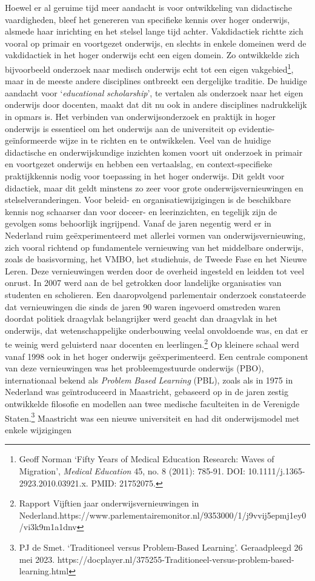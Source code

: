 \documentclass[smallauthor, chapterhaspagenum, nochapterinheader, pagenuminheader,  bigchapnum,medium2, tocpages,  garamond, titleinheader]{jote-book}
\begin{document}
	Hoewel er al geruime tijd meer aandacht is voor ontwikkeling van didactische vaardigheden, bleef het genereren van specifieke kennis over hoger onderwijs, alsmede haar inrichting en het stelsel lange tijd achter. Vakdidactiek richtte zich vooral op primair en voortgezet onderwijs, en slechts in enkele domeinen werd de vakdidactiek in het hoger onderwijs echt een eigen domein. Zo ontwikkelde zich bijvoorbeeld onderzoek naar medisch onderwijs echt tot een eigen vakgebied\footnote{Geoff Norman ‘Fifty Years of Medical Education Research: Waves of Migration', \emph{Medical}\emph{ }\emph{Education}\emph{ }45, no. 8 (2011): 785-91. DOI: 10.1111/j.1365-2923.2010.03921.x. PMID: 21752075.}, maar in de meeste andere disciplines ontbreekt een dergelijke traditie. De huidige aandacht voor ‘\emph{educational}\emph{ }\emph{scholarship}', te vertalen als onderzoek naar het eigen onderwijs door docenten, maakt dat dit nu ook in andere disciplines nadrukkelijk in opmars is. Het verbinden van onderwijsonderzoek en praktijk in hoger onderwijs is essentieel om het onderwijs aan de universiteit op evidentie-geïnformeerde wijze in te richten en te ontwikkelen. Veel van de huidige didactische en onderwijskundige inzichten komen voort uit onderzoek in primair en voortgezet onderwijs en hebben een vertaalslag, en context-specifieke praktijkkennis nodig voor toepassing in het hoger onderwijs. Dit geldt voor didactiek, maar dit geldt minstens zo zeer voor grote onderwijsvernieuwingen en stelselveranderingen. Voor beleid- en organisatiewijzigingen is de beschikbare kennis nog schaarser dan voor doceer- en leerinzichten, en tegelijk zijn de gevolgen soms behoorlijk ingrijpend. Vanaf de jaren negentig werd er in Nederland ruim geëxperimenteerd met allerlei vormen van onderwijsvernieuwing, zich vooral richtend op fundamentele vernieuwing van het middelbare onderwijs, zoals de basisvorming, het VMBO, het studiehuis, de Tweede Fase en het Nieuwe Leren. Deze vernieuwingen werden door de overheid ingesteld en leidden tot veel onrust. In 2007 werd aan de bel getrokken door landelijke organisaties van studenten en scholieren. Een daaropvolgend parlementair onderzoek constateerde dat vernieuwingen die sinds de jaren 90 waren ingevoerd omstreden waren doordat politiek draagvlak belangrijker werd geacht dan draagvlak in het onderwijs, dat wetenschappelijke onderbouwing veelal onvoldoende was, en dat er te weinig werd geluisterd naar docenten en leerlingen.\footnote{Rapport Vijftien jaar onderwijsvernieuwingen in Nederland.https://www.parlementairemonitor.nl/9353000/1/j9vvij5epmj1ey0/vi3k9m1a1dnv} Op kleinere schaal werd vanaf 1998 ook in het hoger onderwijs geëxperimenteerd. Een centrale component van deze vernieuwingen was het probleemgestuurde onderwijs (PBO), internationaal bekend als \emph{Problem}\emph{ }\emph{Based}\emph{ Learning} (PBL), zoals als in 1975 in Nederland was geïntroduceerd in Maastricht, gebaseerd op in de jaren zestig ontwikkelde filosofie en modellen aan twee medische faculteiten in de Verenigde Staten.\footnote{PJ de Smet. ‘Traditioneel versus Problem-Based Learning'. Geraadpleegd 26 mei 2023. https://docplayer.nl/375255-Traditioneel-versus-problem-based-learning.html} Maastricht was een nieuwe universiteit en had dit onderwijsmodel met enkele wijzigingen 
\end{document}
